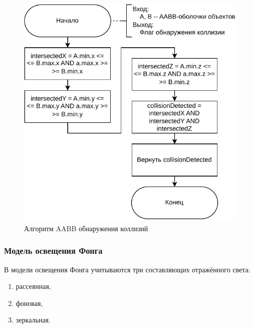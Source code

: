 \begin{figure}[H]
	\centering
	\includegraphics[scale=1]{diag/aabb_tighter.pdf}
	\caption{Алгоритм AABB обнаружения коллизий}
	\label{fig:aabb}
\end{figure}



\subsubsection{Модель освещения Фонга}

В модели освещения Фонга \cite{realphong, phong} учитываются три составляющих отражённого света:
\begin{enumerate}
    \item рассеянная,
    \item фоновая,
    \item зеркальная.
\end{enumerate}

